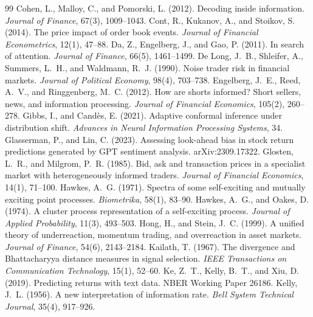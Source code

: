 \documentclass[11pt,a4paper]{article}
\theoremstyle{plain}
\theoremstyle{definition}
\theoremstyle{remark}
\begin{document}
\begin{thebibliography}{99}
 Cohen, L., Malloy, C., and Pomorski, L. (2012). Decoding inside information. \emph{Journal of Finance}, 67(3), 1009--1043.
 Cont, R., Kukanov, A., and Stoikov, S. (2014). The price impact of order book events. \emph{Journal of Financial Econometrics}, 12(1), 47--88.
 Da, Z., Engelberg, J., and Gao, P. (2011). In search of attention. \emph{Journal of Finance}, 66(5), 1461--1499.
 De Long, J.~B., Shleifer, A., Summers, L.~H., and Waldmann, R.~J. (1990). Noise trader risk in financial markets. \emph{Journal of Political Economy}, 98(4), 703--738.
 Engelberg, J.~E., Reed, A.~V., and Ringgenberg, M.~C. (2012). How are shorts informed? Short sellers, news, and information processing. \emph{Journal of Financial Economics}, 105(2), 260--278.
 Gibbs, I., and Cand\`es, E. (2021). Adaptive conformal inference under distribution shift. \emph{Advances in Neural Information Processing Systems}, 34.
 Glasserman, P., and Lin, C. (2023). Assessing look-ahead bias in stock return predictions generated by GPT sentiment analysis. arXiv:2309.17322.
 Glosten, L.~R., and Milgrom, P.~R. (1985). Bid, ask and transaction prices in a specialist market with heterogeneously informed traders. \emph{Journal of Financial Economics}, 14(1), 71--100.
 Hawkes, A.~G. (1971). Spectra of some self-exciting and mutually exciting point processes. \emph{Biometrika}, 58(1), 83--90.
 Hawkes, A.~G., and Oakes, D. (1974). A cluster process representation of a self-exciting process. \emph{Journal of Applied Probability}, 11(3), 493--503.
 Hong, H., and Stein, J.~C. (1999). A unified theory of underreaction, momentum trading, and overreaction in asset markets. \emph{Journal of Finance}, 54(6), 2143--2184.
 Kailath, T. (1967). The divergence and Bhattacharyya distance measures in signal selection. \emph{IEEE Transactions on Communication Technology}, 15(1), 52--60.
 Ke, Z.~T., Kelly, B.~T., and Xiu, D. (2019). Predicting returns with text data. NBER Working Paper 26186.
 Kelly, J.~L. (1956). A new interpretation of information rate. \emph{Bell System Technical Journal}, 35(4), 917--926.

\end{thebibliography}
\end{document}
